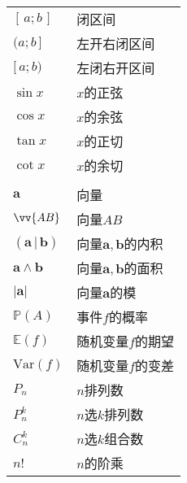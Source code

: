 \documentclass[12pt,UTF8]{article}
\begin{document}
\begin{longtable}{ m{15em} m{15em} }
    $[\,a;b\,]$ & 闭区间 \\
    $(a;b\,]$ & 左开右闭区间 \\
    $[\,a;b)$ & 左闭右开区间 \\
    $\sin{x}$ & $x$的正弦 \\
    $\cos{x}$ & $x$的余弦 \\
    $\tan{x}$ & $x$的正切 \\
    $\cot{x}$ & $x$的余切 \\
    & \\
    $\mathbf{a}$ & 向量 \\
    $\vv{AB}$ & 向量$AB$\\
    $(\mathbf{a}\, | \, \mathbf{b})$ & 向量$\mathbf{a},\mathbf{b}$的内积 \\
    $\mathbf{a}\wedge \mathbf{b}$ & 向量$\mathbf{a},\mathbf{b}$的面积 \\
    $|\mathbf{a}|$ & 向量$\mathbf{a}$的模 \\
    $\mathbb{P}(A)$ & 事件$f$的概率 \\
    $\mathbb{E}(f)$ & 随机变量$f$的期望 \\
    $\mathrm{Var}(f)$ & 随机变量$f$的变差 \\
    $P_n$ & $n$排列数 \\
    $P_n^k$ & $n$选$k$排列数 \\
    $C_n^k$ & $n$选$k$组合数 \\
    $n!$ & $n$的阶乘 \\

\end{longtable}
\end{document}
